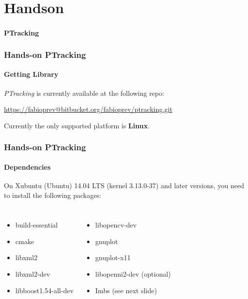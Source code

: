 \section{Handson}

\begin{frame}
	\frametitle{}
	
	\Huge
	
	\vspace{0.5cm}
	
	\begin{center}
		\textbf{PTracking}
	\end{center}
\end{frame}

\begin{frame}
	\frametitle{Hands-on PTracking}
	\framesubtitle{Getting Library}
	
	\Large
	
	\emph{PTracking} is currently available at the following repo:
	\begin{center}
		\url{https://fabioprev@bitbucket.org/fabioprev/ptracking.git}
	\end{center}
	
	\vspace{0.2cm}
	
	Currently the only supported platform is \textbf{Linux}.
\end{frame}

\begin{frame}
	\frametitle{Hands-on PTracking}
	\framesubtitle{Dependencies}
	
	\Large
	
	On Xubuntu (Ubuntu) 14.04 LTS (kernel 3.13.0-37) and later versions, you need to install
	the following packages:
	
	\vspace{0.2cm}
	
	\begin{columns}[T]
		
		\begin{itemize}
			\item build-essential
			\item cmake
			\item libxml2
			\item libxml2-dev
			\item libboost1.54-all-dev
		\end{itemize}
		
		\centering
		
		\begin{itemize}
			\item libopencv-dev
			\item gnuplot
			\item gnuplot-x11
			\item libopenni2-dev (optional)
			\item Imbs (see next slide)
		\end{itemize}
	\end{columns}
\end{frame}

